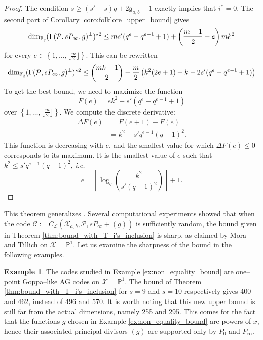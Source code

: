 \documentclass[peerreview]{IEEEtran}
\theoremstyle{plain}
\theoremstyle{definition}
\newtheorem{example}[thm]{Example}
\theoremstyle{remark}
\newcommand{\calP}{\mathcal{P}}
\newcommand{\calL}{\mathcal{L}}
\newcommand{\calC}{\mathcal{C}}
\newcommand{\calX}{\mathcal{X}}
\newcommand{\fq}{\mathbb{F}_{q}}
\newcommand{\PP}{\mathbb{P}}
\newcommand{\set}[1]{\left\{#1\right\}}
\begin{document}
	\begin{proof}
		The condition $s \geq (s'-s)q+2\mathfrak{g}_{a,b}-1$ exactly implies that $i^*=0$. The second part of Corollary \ref{coro:folklore_upper_bound} gives
		\[		\dim_{\fq} (\Gamma(\calP,sP_\infty,g)^{\perp})^{\star 2} \leq ms'(q^e-q^{e-1}+1) \\+ \left( \frac{m-1}{2} -e \right)mk^2\]
	for every $e \in \set{1,\dots,\lfloor \frac{m}{2} \rfloor}$. This can be rewritten 
	\[	\dim_{\fq} (\Gamma(\calP,sP_\infty,g)^{\perp})^{\star 2} \leq \binom{mk+1}{2} \\- \dfrac{m}{2}\left(k^2(2e+1)+k-2s'(q^e-q^{e-1}+1)\right)\]
		To get the best bound, we need to maximize the function
		$$F(e) = ek^2-s'(q^e-q^{e-1}+1)$$
		over $\set{1,\dots,\lfloor \frac{m}{2} \rfloor}$.
		We compute the discrete derivative:
		\begin{align*}
			\Delta F(e) &= F(e+1)-F(e) \\
			&= k^2 - s'q^{e-1}(q-1)^2.
		\end{align*}
		This function is decreasing with $e$, and the smallest value for which $\Delta F(e) \leq 0$ corresponds to its maximum. It is the smallest value of $e$ such that $k^2 \leq s'q^{e-1}(q-1)^2$, \emph{i.e.}
		$$e =  \left\lceil \log_q\left(\dfrac{k^2}{s'(q-1)^2}\right)\right\rceil+1.$$
	\end{proof}
	
	This theorem generalizes \cite[Corollary 27]{MT21}. Several computational experiments showed that when the code $\calC:=C_{\calL}(\calX_{a,b},\calP,sP_\infty+(g))$ is sufficiently random, the bound given in Theorem \ref{thm:bound_with_T_i's_inclusion} is sharp, as claimed by Mora and Tillich \cite[Remark 28]{MT21} on ${\calX=\PP^1}$. Let us examine the sharpness of the bound in the following examples.
	
	\begin{example}\label{ex:comp}
		The codes studied in Example \ref{ex:non_equality_bound} are one--point Goppa--like AG codes on ${\calX=\PP^1}$. The bound of Theorem \ref{thm:bound_with_T_i's_inclusion} for $s=9$ and $s=10$ respectively gives 400 and 462, instead of 496 and 570. It is worth noting that this new upper bound is still far from the actual dimensions, namely 255 and 295. This comes for the fact that the functions $g$ chosen in Example \ref{ex:non_equality_bound} are powers of $x$, hence their associated principal divisors $(g)$ are supported only by $P_0$ and $P_\infty$.
	\end{example}
	
\end{document}
